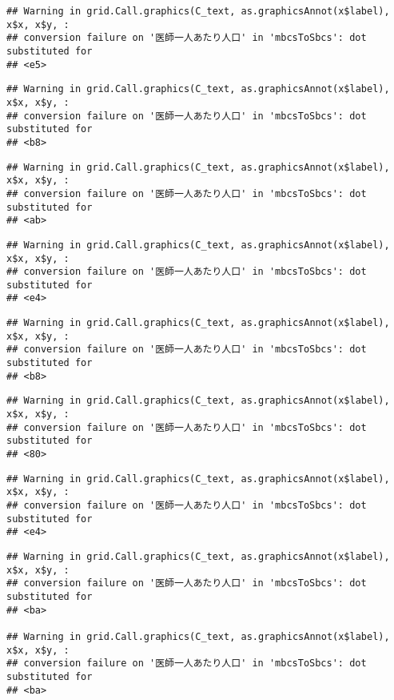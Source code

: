 \documentclass[
]{article}
\begin{document}
\begin{verbatim}
## Warning in grid.Call.graphics(C_text, as.graphicsAnnot(x$label), x$x, x$y, :
## conversion failure on '医師一人あたり人口' in 'mbcsToSbcs': dot substituted for
## <e5>
\end{verbatim}

\begin{verbatim}
## Warning in grid.Call.graphics(C_text, as.graphicsAnnot(x$label), x$x, x$y, :
## conversion failure on '医師一人あたり人口' in 'mbcsToSbcs': dot substituted for
## <b8>
\end{verbatim}

\begin{verbatim}
## Warning in grid.Call.graphics(C_text, as.graphicsAnnot(x$label), x$x, x$y, :
## conversion failure on '医師一人あたり人口' in 'mbcsToSbcs': dot substituted for
## <ab>
\end{verbatim}

\begin{verbatim}
## Warning in grid.Call.graphics(C_text, as.graphicsAnnot(x$label), x$x, x$y, :
## conversion failure on '医師一人あたり人口' in 'mbcsToSbcs': dot substituted for
## <e4>
\end{verbatim}

\begin{verbatim}
## Warning in grid.Call.graphics(C_text, as.graphicsAnnot(x$label), x$x, x$y, :
## conversion failure on '医師一人あたり人口' in 'mbcsToSbcs': dot substituted for
## <b8>
\end{verbatim}

\begin{verbatim}
## Warning in grid.Call.graphics(C_text, as.graphicsAnnot(x$label), x$x, x$y, :
## conversion failure on '医師一人あたり人口' in 'mbcsToSbcs': dot substituted for
## <80>
\end{verbatim}

\begin{verbatim}
## Warning in grid.Call.graphics(C_text, as.graphicsAnnot(x$label), x$x, x$y, :
## conversion failure on '医師一人あたり人口' in 'mbcsToSbcs': dot substituted for
## <e4>
\end{verbatim}

\begin{verbatim}
## Warning in grid.Call.graphics(C_text, as.graphicsAnnot(x$label), x$x, x$y, :
## conversion failure on '医師一人あたり人口' in 'mbcsToSbcs': dot substituted for
## <ba>

## Warning in grid.Call.graphics(C_text, as.graphicsAnnot(x$label), x$x, x$y, :
## conversion failure on '医師一人あたり人口' in 'mbcsToSbcs': dot substituted for
## <ba>
\end{verbatim}
\end{document}

